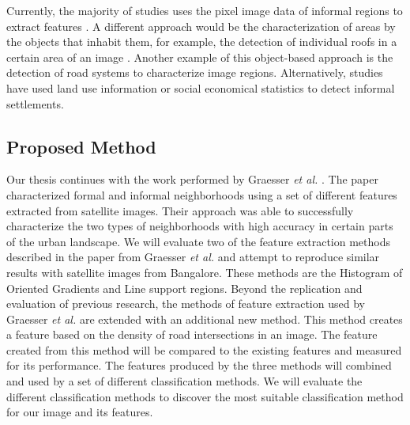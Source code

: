 Currently, the majority of studies uses the pixel image data of informal regions to extract features \cite{kuffer2016slums}. A different approach would be the characterization of areas by the objects that inhabit them, for example, the detection of individual roofs in a certain area of an image \cite{williams2016automatic}. Another example of this object-based approach is the detection of road systems to characterize image regions. Alternatively, studies have used land use information \cite{novack2010urban} or social economical statistics \cite{engstrom2011using} to detect informal settlements.



 
\subsection{Proposed Method}

Our thesis continues with the work performed by Graesser \textit{et al.} \cite{graesser2012image}. The paper characterized formal and informal neighborhoods using a set of different features extracted from satellite images. Their approach was able to successfully characterize the two types of neighborhoods with high accuracy in certain parts of the urban landscape. We will evaluate two of the feature extraction methods described in the paper from Graesser \textit{et al.} and attempt to reproduce similar results with satellite images from Bangalore. These methods are the Histogram of Oriented Gradients and Line support regions. Beyond the replication and evaluation of previous research, the methods of feature extraction used by Graesser \textit{et al.} are extended with an additional new method. This method creates a feature based on the density of road intersections in an image. The feature created from this method will be compared to the existing features and measured for its performance. The features produced by the three methods will combined and used by a set of different classification methods. We will evaluate the different classification methods to discover the most suitable classification method for our image and its features. 




